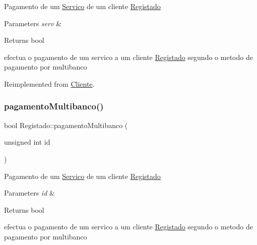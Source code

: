Pagamento de um \hyperlink{class_servico}{Servico} de um cliente \hyperlink{class_registado}{Registado}


\begin{DoxyParams}{Parameters}
{\em serv} & \\
\hline
\end{DoxyParams}
\begin{DoxyReturn}{Returns}
bool
\end{DoxyReturn}
efectua o pagamento de um servico a um cliente \hyperlink{class_registado}{Registado} segundo o metodo de pagamento por multibanco 

Reimplemented from \hyperlink{class_cliente_a6e230e5e512bebe07bfa1ad6750b8cee}{Cliente}.

\mbox{\label{class_registado_a3338ad6a9c5980671f2eb3b48d8798de}} 
\subsubsection{\texorpdfstring{pagamento\+Multibanco()}{pagamentoMultibanco()}\hspace{0.1cm}{\footnotesize\ttfamily [2/2]}}
{\footnotesize\ttfamily bool Registado\+::pagamento\+Multibanco (\begin{DoxyParamCaption}\item[{unsigned int}]{id }\end{DoxyParamCaption})\hspace{0.3cm}{\ttfamily [virtual]}}

Pagamento de um \hyperlink{class_servico}{Servico} de um cliente \hyperlink{class_registado}{Registado}


\begin{DoxyParams}{Parameters}
{\em id} & \\
\hline
\end{DoxyParams}
\begin{DoxyReturn}{Returns}
bool
\end{DoxyReturn}
efectua o pagamento de um servico a um cliente \hyperlink{class_registado}{Registado} segundo o metodo de pagamento por multibanco \mbox{\label{class_registado_af3c8f63f7df1cdfd27e44126f78b71d8}} 
